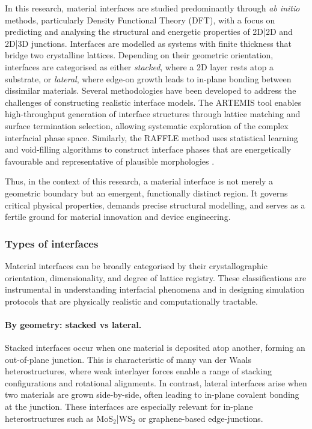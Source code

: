 In this research, material interfaces are studied predominantly through \textit{ab initio} methods, particularly Density Functional Theory (DFT), with a focus on predicting and analysing the structural and energetic properties of 2D|2D and 2D|3D junctions. Interfaces are modelled as systems with finite thickness that bridge two crystalline lattices. Depending on their geometric orientation, interfaces are categorised as either \emph{stacked}, where a 2D layer rests atop a substrate, or \emph{lateral}, where edge-on growth leads to in-plane bonding between dissimilar materials.
Several methodologies have been developed to address the challenges of constructing realistic interface models. The ARTEMIS tool enables high-throughput generation of interface structures through lattice matching and surface termination selection, allowing systematic exploration of the complex interfacial phase space. Similarly, the RAFFLE method uses statistical learning and void-filling algorithms to construct interface phases that are energetically favourable and representative of plausible morphologies .

Thus, in the context of this research, a material interface is not merely a geometric boundary but an emergent, functionally distinct region. It governs critical physical properties, demands precise structural modelling, and serves as a fertile ground for material innovation and device engineering.

\subsubsection{Types of interfaces}

Material interfaces can be broadly categorised by their crystallographic orientation, dimensionality, and degree of lattice registry. These classifications are instrumental in understanding interfacial phenomena and in designing simulation protocols that are physically realistic and computationally tractable.

\paragraph{By geometry: stacked vs lateral.} Stacked interfaces occur when one material is deposited atop another, forming an out-of-plane junction. This is characteristic of many van der Waals heterostructures, where weak interlayer forces enable a range of stacking configurations and rotational alignments. In contrast, lateral interfaces arise when two materials are grown side-by-side, often leading to in-plane covalent bonding at the junction. These interfaces are especially relevant for in-plane heterostructures such as MoS$_2$|WS$_2$ or graphene-based edge-junctions.

